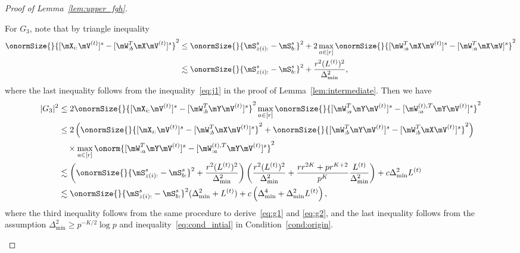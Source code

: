 \documentclass[lettersize,onecolumn,journal]{IEEEtran}
\theoremstyle{definition}
\theoremstyle{definition}
\newcommand{\of}[1]{\left(#1\right)}
\begin{document}
\begin{proof}[Proof of Lemma~\ref{lem:upper_fgh}]
\begin{enumerate}[wide]
{    For $G_3$, note that by triangle inequality
    \begin{align}
        \onormSize{}{[\mX_{i:} \mV^{(t)}]^s  -  [  \mW_{:b}^T \mX \mV^{(t)} ]^s}^2 &\leq \onormSize{}{\mS_{z(i):}^s - \mS_{b:}^s}^2 + 2\max_{a \in [r]}\onormSize{}{[\mW_{:a}^T\mX \mV^{(t)}]^s - [\mW_{:a}^T\mX \mV]^s }^2\\
        & \lesssim \onormSize{}{\mS_{z(i):}^s - \mS_{b:}^s}^2 + \frac{r^2 (L^{(t)})^2}{\Delta_{\min}^2}, \label{eq:g3xv_wxv}
    \end{align}
    where the last inequality follows from the inequality~\eqref{eq:j1} in the proof of Lemma~\ref{lem:intermediate}.
   Then we have 
    \begin{align}
        |G_3|^2 & \leq 2 \onormSize{}{[\mX_{i:} \mV^{(t)}]^s  -  [  \mW_{:b}^T \mY \mV^{(t)} ]^s}^2 \max_{a \in [r]} \onormSize{}{ [  \mW_{:a}^T \mY \mV^{(t)} ]^s -  [   \mW_{:a}^{(t),T} \mY \mV^{(t)}  ]^s}^2 \\
        & \leq 2 \of{ \onormSize{}{[\mX_{i:} \mV^{(t)}]^s  -  [  \mW_{:b}^T \mX \mV^{(t)} ]^s}^2  +  \onormSize{}{ [  \mW_{:b}^T \mY \mV^{(t)} ]^s  -  [  \mW_{:b}^T \mX \mV^{(t)} ]^s}^2  } \\
        & \quad \times \max_{a \in [r]} \onorm{ [  \mW_{:a}^T \mY \mV^{(t)} ]^s -  [   \mW_{:a}^{(t),T} \mY \mV^{(t)}  ]^s}^2\\
        & \lesssim \of{\onormSize{}{\mS_{z(i):}^s - \mS_{b:}^s}^2 + \frac{r^2 (L^{(t)})^2}{\Delta_{\min}^2} } \of{ \frac{r^2(L^{(t)})^2}{ \Delta_{\min}^2} + \frac{r r^{2K} + pr^{K+2}}{p^{K}} \frac{L^{(t)}}{\Delta_{\min}^2}}+ c \Delta_{\min}^2 L^{(t)} \\
        & \lesssim \onormSize{}{\mS_{z(i):}^s - \mS_{b:}^s}^2 (\Delta_{\min}^2 + L^{(t)}) + c\of{\Delta_{\min}^4 +  \Delta_{\min}^2 L^{(t)}},\label{eq:g3}
    \end{align}
    where the third inequality follows from the same procedure to derive~\eqref{eq:g1} and \eqref{eq:g2}, and the last inequality follows from the assumption $\Delta_{\min}^2 \geq p^{-K/2} \log p$ and inequality~\eqref{eq:cond_intial} in Condition~\ref{cond:origin}.

}
\end{enumerate}
\end{proof}
\end{document}
